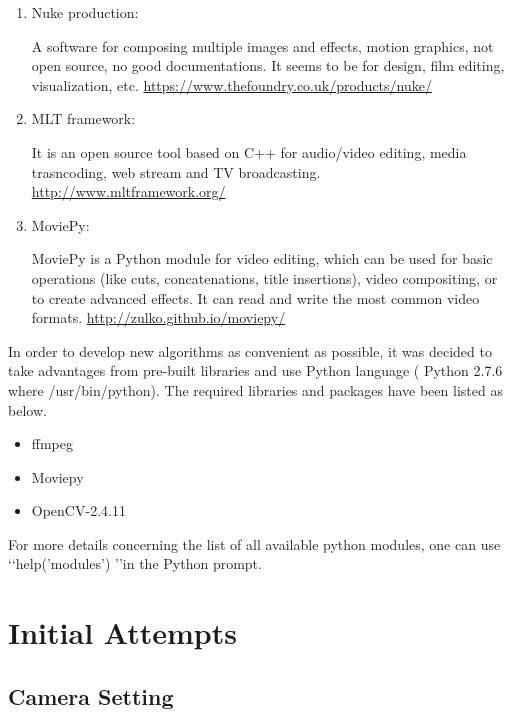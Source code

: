 \documentclass[[12pt,DIV14,BCOR12mm,a4paper,footexclude,headinclude,halfparskip-,twoside,openright,cleardoubleempty,idxtotoc,bibtotoc]{article}
\begin{document}
\begin{enumerate}
\item Nuke production:

A software for composing multiple images and effects, motion graphics, not open source, no good documentations. It seems to be for design, film editing, visualization, etc. \url{https://www.thefoundry.co.uk/products/nuke/}

\item MLT framework:

It is an open source tool based on C++ for audio/video editing, media trasncoding, web stream and TV broadcasting. \url{http://www.mltframework.org/}


\item MoviePy:

MoviePy is a Python module for video editing, which can be used for basic operations (like cuts, concatenations, title insertions), video compositing, or to create advanced effects. It can read and write the most common video formats. \url{http://zulko.github.io/moviepy/}

\end{enumerate}

In order to develop new algorithms as convenient as possible, it was decided to take advantages from pre-built libraries and use Python language ( Python 2.7.6 where /usr/bin/python). The required libraries and packages have been listed as below.



\begin{itemize}
	\item ffmpeg
	\item Moviepy
	\item OpenCV-2.4.11	
\end{itemize}

For more details concerning the list of all available python modules, one can use \lq\lq help('modules') \rq\rq in the Python prompt.





\section{Initial Attempts}

\subsection{Camera Setting}
\end{document}
